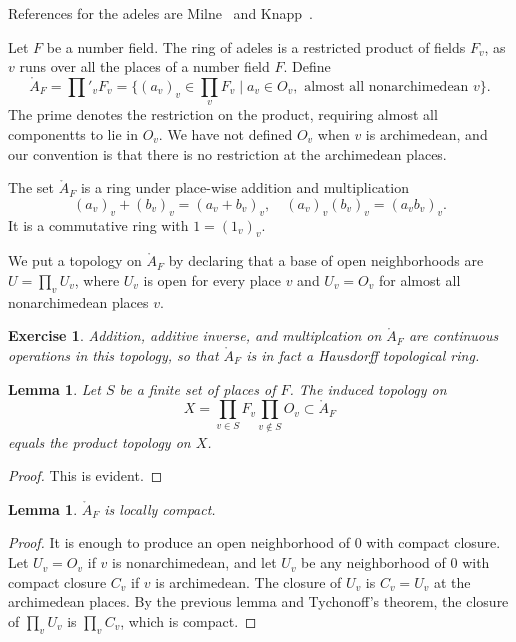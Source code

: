 \documentclass{amsart}
\newtheorem{lemma}[equation]{Lemma}
\newtheorem{exercise}{Exercise}
\def\AA{\ring{A}}
\begin{document}
References for the adeles are Milne~\cite{CFT} and Knapp~\cite[VI.10]{knapp-advanced}.

Let $F$ be a number field.
The ring of adeles is a restricted product of fields $F_v$, as $v$ runs over all the places
of a number field $F$.    Define
\[
\AA_F = \prod'_{v} F_v = \{ (a_v)_v \in\prod_v F_v \mid a_v \in O_v, \text{ almost all 
nonarchimedean~} v\}.
\]
The prime denotes the restriction on the product, requiring almost all componentts
to lie in $O_v$.   We have not defined $O_v$ when $v$ is archimedean, and our convention
is that there is no restriction at the archimedean places.
\indy{Notation}{AF@$\AA_F$ (adele ring)}

The set $\AA_F$ is a ring under place-wise addition and multiplication
\[
(a_v)_v + (b_v)_v = (a_v+b_v)_v,\quad (a_v)_v (b_v)_v = (a_v b_v)_v.
\]
It is a commutative ring with $1 = (1_v)_v$.

We put a topology on $\AA_F$ by declaring that a base of open neighborhoods 
are $U=\prod_v U_v$, where $U_v$ is open for every place $v$ and $U_v = O_v$ for
almost all nonarchimedean places $v$.

\begin{exercise}  Addition, additive inverse, and multiplcation on $\AA_F$ are continuous
operations in this topology, so that $\AA_F$ is in fact a Hausdorff topological ring.
\end{exercise}

\begin{lemma}  Let $S$ be a finite set of places of $F$.  The induced topology on
\[
X=\prod_{v\in S} F_v \prod _{v\not\in S} O_v \subset \AA_F
\]
equals the product topology on $X$.
\end{lemma}

\begin{proof} This is evident. \end{proof}

\begin{lemma}  $\AA_F$ is locally compact.
\end{lemma}

\begin{proof} It is enough to produce an open neighborhood of $0$ with
  compact closure.  Let $U_v=O_v$ if $v$ is nonarchimedean, and let
  $U_v$ be any neighborhood of $0$ with compact closure $C_v$ if $v$
  is archimedean.  The closure of $U_v$ is $C_v=U_v$ at the
  archimedean places.  By the previous lemma and Tychonoff's theorem,
  the closure of $\prod_v U_v$ is $\prod_v C_v$, which is compact.
\end{proof}
\end{document}
